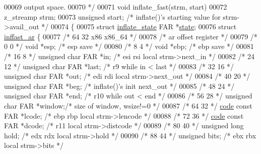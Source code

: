\begin{DoxyCode}
{{00069 \textcolor{comment}{      output space.}
00070 \textcolor{comment}{ */}
00071 \textcolor{keywordtype}{void} inflate\_fast(strm, start)
00072 z\_streamp strm;
00073 \textcolor{keywordtype}{unsigned} start;         \textcolor{comment}{/* inflate()'s starting value for strm->avail\_out */}
00074 \{
00075     \textcolor{keyword}{struct }\hyperlink{structinflate__state}{inflate\_state} FAR *\hyperlink{structstate}{state};
00076     \textcolor{keyword}{struct }\hyperlink{structinffast__ar}{inffast\_ar} \{
00077 \textcolor{comment}{/* 64   32                               x86  x86\_64 */}
00078 \textcolor{comment}{/* ar offset                              register */}
00079 \textcolor{comment}{/*  0    0 */} \textcolor{keywordtype}{void} *esp;                \textcolor{comment}{/* esp save */}
00080 \textcolor{comment}{/*  8    4 */} \textcolor{keywordtype}{void} *ebp;                \textcolor{comment}{/* ebp save */}
00081 \textcolor{comment}{/* 16    8 */} \textcolor{keywordtype}{unsigned} \textcolor{keywordtype}{char} FAR *in;    \textcolor{comment}{/* esi rsi  local strm->next\_in */}
00082 \textcolor{comment}{/* 24   12 */} \textcolor{keywordtype}{unsigned} \textcolor{keywordtype}{char} FAR *last;  \textcolor{comment}{/*     r9   while in < last */}
00083 \textcolor{comment}{/* 32   16 */} \textcolor{keywordtype}{unsigned} \textcolor{keywordtype}{char} FAR *out;   \textcolor{comment}{/* edi rdi  local strm->next\_out */}
00084 \textcolor{comment}{/* 40   20 */} \textcolor{keywordtype}{unsigned} \textcolor{keywordtype}{char} FAR *beg;   \textcolor{comment}{/*          inflate()'s init next\_out */}
00085 \textcolor{comment}{/* 48   24 */} \textcolor{keywordtype}{unsigned} \textcolor{keywordtype}{char} FAR *end;   \textcolor{comment}{/*     r10  while out < end */}
00086 \textcolor{comment}{/* 56   28 */} \textcolor{keywordtype}{unsigned} \textcolor{keywordtype}{char} FAR *window;\textcolor{comment}{/*          size of window, wsize!=0 */}
00087 \textcolor{comment}{/* 64   32 */} \hyperlink{structcode}{code} \textcolor{keyword}{const} FAR *lcode;    \textcolor{comment}{/* ebp rbp  local strm->lencode */}
00088 \textcolor{comment}{/* 72   36 */} \hyperlink{structcode}{code} \textcolor{keyword}{const} FAR *dcode;    \textcolor{comment}{/*     r11  local strm->distcode */}
00089 \textcolor{comment}{/* 80   40 */} \textcolor{keywordtype}{unsigned} \textcolor{keywordtype}{long} hold;       \textcolor{comment}{/* edx rdx  local strm->hold */}
00090 \textcolor{comment}{/* 88   44 */} \textcolor{keywordtype}{unsigned} bits;            \textcolor{comment}{/* ebx rbx  local strm->bits */}
}}
\end{DoxyCode}
